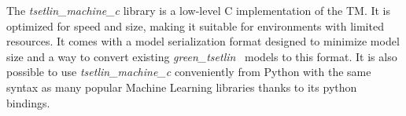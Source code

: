 \documentclass[english]{aghengthesis} %
\newcommand*{\LibraryName}{\emph{tsetlin\_machine\_c }}
\newcommand*{\GreenTsetlinName}{\emph{green\_tsetlin}~\cite{glimsdal2024greentsetlin} }
\begin{document}
The \LibraryName library is a low-level C implementation of the TM. It is optimized for speed and size, making it suitable for environments with limited resources. It comes with a model serialization format designed to minimize model size and a way to convert existing \GreenTsetlinName models to this format. It is also possible to use \LibraryName conveniently from Python with the same syntax as many popular Machine Learning libraries thanks to its python bindings.








\end{document}
